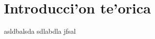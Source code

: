 \section{Introducci'on te'orica}


\fboxsep 8pt
\begin{boxedverbatim}
asldbalsda
sdlabdla
jfsal
\end{boxedverbatim}


